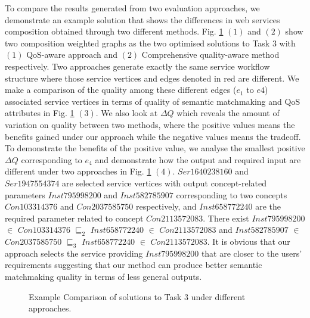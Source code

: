 \documentclass{IEEEtran}
\begin{document}
To compare the results generated from two evaluation approaches, we demonstrate an example solution that shows the differences in web services composition obtained through two different methods. Fig. \ref{comparisontest} $(1)$ and $(2)$ show two composition weighted graphs as the two optimised solutions to Task 3 with $(1)$ QoS-aware approach and $(2)$ Comprehensive quality-aware method respectively. Two approaches generate exactly the same service workflow structure where those service vertices and edges denoted in red are different. We make a comparison of the quality among these different edges ($e_1$ to $e4$) associated service vertices in terms of quality of semantic matchmaking and QoS attributes in Fig. \ref{comparisontest} $(3)$. We also look at $\Delta Q$ which reveals the amount of variation on quality between two methods, where the positive values means the benefits gained under our approach while the negative values means the tradeoff. To demonstrate the benefits of the positive value, we analyse the smallest positive $\Delta Q$ corresponding to $e_4$ and demonstrate how the output and required input are different under two approaches in Fig. \ref{comparisontest} $(4)$. $Ser1640238160$ and $Ser1947554374$ are selected service vertices with output concept-related parameters $Inst795998200$ and $Inst582785907$ corresponding to two concepts $Con103314376$ and $Con2037585750$ respectively, and $Inst658772240$ are the required parameter related to concept $Con2113572083$. There exist $Inst795998200$ $\in$ $Con103314376$ $\sqsubseteq_{2}$ $Inst658772240$ $\in$ $Con2113572083$ and $Inst582785907$ $\in$ $Con2037585750$ $\sqsubseteq_{3}$ $Inst658772240$ $\in$ $Con2113572083$. It is obvious that our approach selects the service providing $Inst795998200$ that are closer to the users' requirements suggesting that our method can produce better semantic matchmaking quality in terms of less general outputs.

\begin{figure}[h]
 \caption{Example Comparison of solutions to Task 3 under different approaches.}
 \label{comparisontest}
\end{figure}
\end{document}
